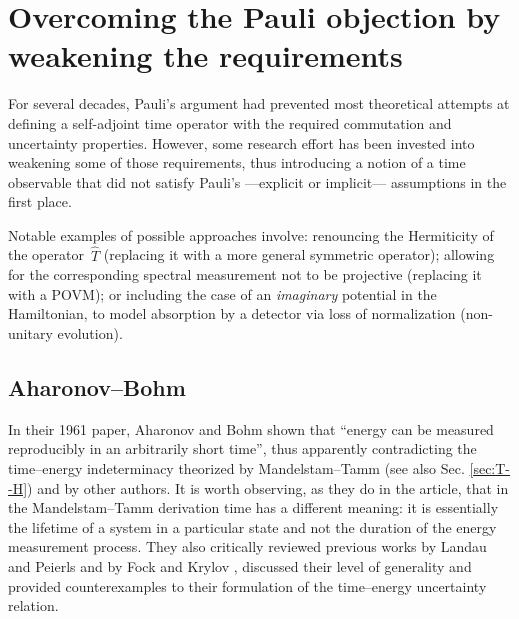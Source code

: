 \section{Overcoming the Pauli objection by weakening the requirements}

For several decades, Pauli's argument had prevented most theoretical attempts at
defining a self-adjoint time operator with the required commutation and uncertainty properties.
However, some research effort has been invested
into weakening some of those requirements, thus
introducing a notion of a time observable that did not satisfy
Pauli's ---explicit or implicit--- assumptions in the first place.

Notable examples of possible approaches involve:
renouncing the Hermiticity of the operator~$\hat{T}$ (replacing it with a more general symmetric operator);
allowing for the corresponding spectral measurement not to be projective (replacing it with a POVM);
or including the case of an \emph{imaginary} potential in the Hamiltonian,
to model absorption by a detector via loss of normalization (non-unitary evolution).

\subsection{Aharonov--Bohm}

In their 1961 paper, Aharonov and Bohm \parencite{AharonovBohm}
shown that ``energy can be measured
  reproducibly in an arbitrarily short time'',
thus apparently contradicting the time--energy indeterminacy theorized
by Mandelstam--Tamm (see also Sec. \ref{sec:T--H}) and by other authors.
It is worth observing,
as they do in the article, that in the Mandelstam--Tamm derivation time has a different meaning:
it is essentially the lifetime of a system in a particular state
and not the duration of the energy measurement process.
They also critically reviewed previous works by Landau and Peierls \parencite{LandauPeierls}
and by Fock and Krylov \parencite{FockKrylov}, discussed their level of generality and provided
counterexamples to their formulation of the time--energy uncertainty relation.


